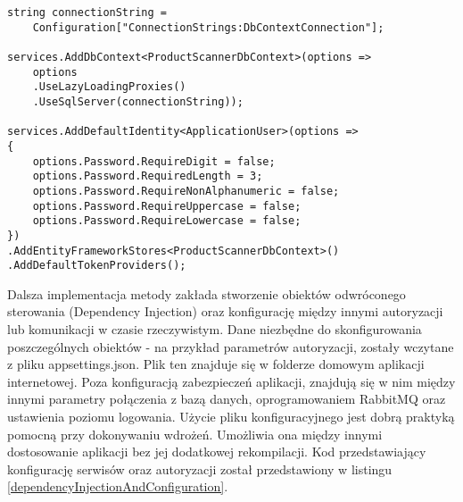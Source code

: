 \begin{lstlisting}[caption={Konfiguracja bazy danych oraz obiektu komunikacji bazodanowej.},label={databaseConfiguration} ]
string connectionString = 
	Configuration["ConnectionStrings:DbContextConnection"];
	
services.AddDbContext<ProductScannerDbContext>(options =>
	options
	.UseLazyLoadingProxies()
	.UseSqlServer(connectionString));

services.AddDefaultIdentity<ApplicationUser>(options =>
{
	options.Password.RequireDigit = false;
	options.Password.RequiredLength = 3;
	options.Password.RequireNonAlphanumeric = false;
	options.Password.RequireUppercase = false;
	options.Password.RequireLowercase = false;
})
.AddEntityFrameworkStores<ProductScannerDbContext>()
.AddDefaultTokenProviders();
\end{lstlisting}


Dalsza implementacja metody zakłada stworzenie obiektów odwróconego sterowania (Dependency Injection) oraz konfigurację między innymi autoryzacji lub komunikacji w czasie rzeczywistym. Dane niezbędne do skonfigurowania poszczególnych obiektów - na przykład parametrów autoryzacji, zostały wczytane z pliku appsettings.json. Plik ten znajduje się w folderze domowym aplikacji internetowej. Poza konfiguracją zabezpieczeń aplikacji, znajdują się w nim między innymi parametry połączenia z bazą danych, oprogramowaniem RabbitMQ oraz ustawienia poziomu logowania. Użycie pliku konfiguracyjnego jest dobrą praktyką pomocną przy dokonywaniu wdrożeń. Umożliwia ona między innymi dostosowanie aplikacji bez jej dodatkowej rekompilacji. Kod przedstawiający konfigurację serwisów oraz autoryzacji został przedstawiony w listingu \ref{dependencyInjectionAndConfiguration}. 

